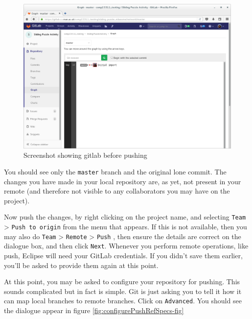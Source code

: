 \documentclass[
]{book}
\begin{document}
\begin{figure}

{\centering \includegraphics[width=1\linewidth]{images/checkGitLabRemoteBeforePush} 

}

\caption{Screenshot showing gitlab before pushing}\label{fig:checkGitLabRemoteBeforePush-fig}
\end{figure}

You should see only the \texttt{master} branch and the original lone commit. The changes you have made in your local repository are, as yet, not present in your remote (and therefore not visible to any collaborators you may have on the project).

Now push the changes, by right clicking on the project name, and selecting \texttt{Team} \textgreater{} \texttt{Push\ to\ origin} from the menu that appears. If this is not available, then you may also do \texttt{Team} \textgreater{} \texttt{Remote} \textgreater{} \texttt{Push} , then ensure the details are correct on the dialogue box, and then click \texttt{Next}. Whenever you perform remote operations, like push, Eclipse will need your GitLab credentials. If you didn't save them earlier, you'll be asked to provide them again at this point.

At this point, you may be asked to configure your repository for pushing. This sounds complicated but in fact is simple. Git is just asking you to tell it how it can map local branches to remote branches. Click on \texttt{Advanced}. You should see the dialogue appear in figure \ref{fig:configurePushRefSpecs-fig}
\end{document}
